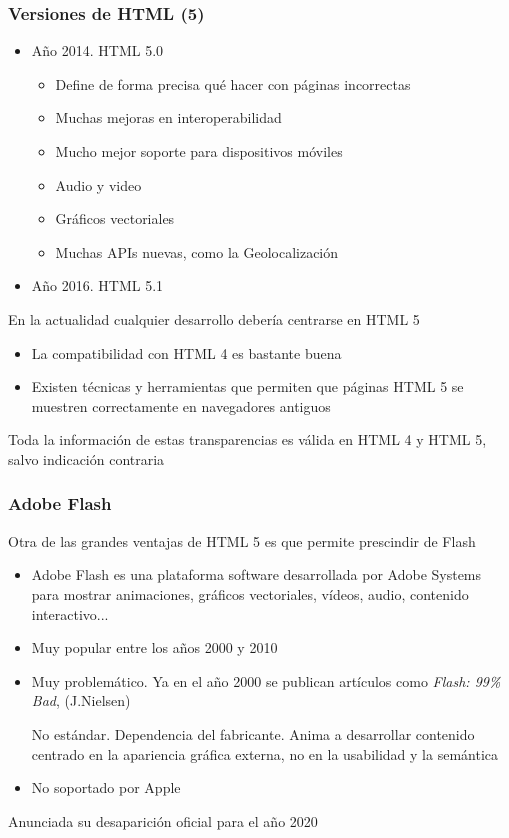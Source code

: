 \documentclass[ucs]{beamer}
\begin{document}
\begin{frame}[fragile]
\frametitle{Versiones de HTML (5)}
\begin{itemize}
\item
Año 2014. HTML 5.0

    \begin{itemize}
    \item
Define de forma precisa qué hacer con páginas incorrectas
    \item
Muchas mejoras en interoperabilidad
    \item
Mucho mejor soporte para dispositivos móviles
    \item
Audio y video
    \item
Gráficos vectoriales
    \item
Muchas APIs nuevas, como la Geolocalización

    \end{itemize}
\item
Año 2016. HTML 5.1
\end{itemize}

En la actualidad cualquier desarrollo debería centrarse en HTML 5

    \begin{itemize}
    \item
La compatibilidad con HTML 4 es bastante buena
    \item
Existen técnicas y herramientas que permiten que páginas HTML 5 se
muestren correctamente en navegadores antiguos
    \end{itemize}
Toda la información de estas transparencias es válida en HTML 4 y HTML 5, salvo
indicación contraria

\end{frame}



\begin{frame}[fragile]
\frametitle{Adobe Flash}
Otra de las grandes ventajas de HTML 5 es que permite prescindir de Flash
\begin{itemize}
\item
Adobe Flash es una plataforma software desarrollada por Adobe Systems
para mostrar animaciones, gráficos vectoriales, vídeos, audio, contenido
interactivo...

\item
Muy popular entre los años 2000 y 2010

\item
Muy problemático. 
Ya en el año 2000 se publican artículos como
\emph{Flash: 99\% Bad}, (J.Nielsen)


No estándar. Dependencia del fabricante.
Anima a desarrollar contenido centrado en la apariencia gráfica
externa, no en la usabilidad y la semántica 

\item
No soportado por Apple
\end{itemize}
Anunciada su desaparición oficial para el año 2020
\end{frame}
\end{document}
